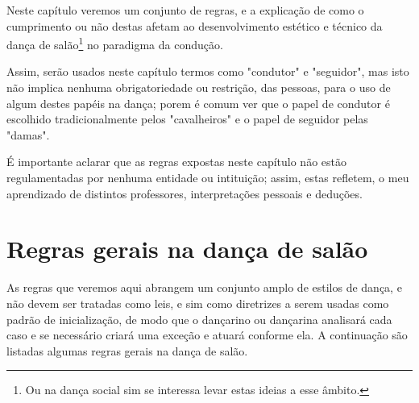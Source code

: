 Neste capítulo veremos um conjunto de regras, e a explicação de como o cumprimento
ou não destas afetam ao desenvolvimento estético e técnico da dança de 
salão\footnote{Ou na dança social sim se interessa levar estas ideias a esse âmbito.}  no paradigma da condução.

Assim, serão usados neste capítulo termos como "condutor" e "seguidor", 
mas isto não implica nenhuma obrigatoriedade ou restrição, das pessoas, para o uso de algum destes papéis na dança;
porem é comum ver que o papel de condutor é escolhido tradicionalmente pelos "cavalheiros" e o papel de seguidor pelas "damas".
\begin{lattention}
É importante aclarar
que as regras expostas neste capítulo não estão regulamentadas por nenhuma entidade ou intituição; assim, estas
refletem, o meu aprendizado de distintos professores,
interpretações pessoais  e deduções. 
\end{lattention}

\section{Regras gerais na dança de salão}
As regras que veremos aqui abrangem um conjunto amplo de estilos de 
dança, e não devem ser
tratadas como leis, e sim como diretrizes a serem usadas como padrão de inicialização, de modo que 
o dançarino ou dançarina analisará cada caso e se necessário criará uma exceção e atuará conforme ela.
A continuação são listadas algumas regras gerais na dança de salão.\\

